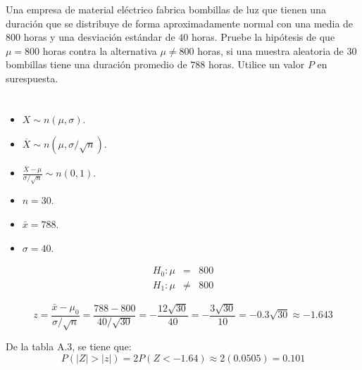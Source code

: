 \begin{enunciado}
 Una empresa de material el\'ectrico fabrica bombillas de luz que tienen una duraci\'on que se distribuye de forma aproximadamente normal con una media de $800$ horas y una desviaci\'on est\'andar de $40$ horas. Pruebe la hip\'otesis de que $\mu = 800$ horas contra la alternativa $\mu \neq 800$ horas, si una muestra aleatoria de $30$ bombillas tiene una duraci\'on promedio de $788$ horas. Utilice un valor $P$ en surespuesta.
\end{enunciado}

\begin{solucion}
 \begin{datos}
  $\phantom{0}$
  \begin{itemize}
   \item $X \sim n(\mu,\sigma)$.
   \item $\overline{X} \sim n\left( \mu, \sigma/\sqrt{n} \right)$.
   \item $\frac{\overline{X}-\mu}{\sigma/\sqrt{n}} \sim n(0,1)$.
   \item $n = 30$.
   \item $\bar{x} = 788$.
   \item $\sigma = 40$.
  \end{itemize}
 \end{datos}

 \begin{hipotesis}
  \begin{eqnarray*}
   H_0: \mu & = & 800 \\
   H_1: \mu & \neq & 800
  \end{eqnarray*}
 \end{hipotesis}

 \begin{estadistico}
  \begin{equation*}
   z = \frac{\bar{x} - \mu_0}{\sigma/\sqrt{n}} = \frac{788-800}{40/\sqrt{30}} = -\frac{12\sqrt{30}}{40} = -\frac{3\sqrt{30}}{10} = -0.3\sqrt{30} \approx -1.643
  \end{equation*}
 \end{estadistico}

 \begin{valorp}
  De la tabla A.3, se tiene que:
  \begin{equation*}
   P(|Z|>|z|) = 2P(Z < -1.64) \approx 2(0.0505) = 0.101 
  \end{equation*}
 \end{valorp}


\end{solucion}
